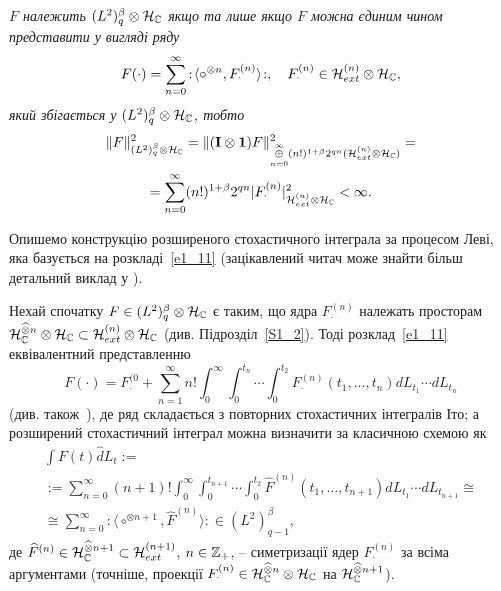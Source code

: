 {\it $F$ належить $(L^2)^\beta_q\otimes\mathcal{H}_{\mathbb{C}}$ якщо та лише якщо $F$ можна
єдиним чином представити у вигляді ряду
\begin{equation}\label{e1_11}
F(\cdot)=\sum_{n=0}^\infty{:\!\langle}\circ^{\otimes n},
F^{(n)}_\cdot{\rangle\!:},
\quad F^{(n)}_\cdot\in\mathcal{H}_{ext}^{(n)}\otimes\mathcal{H}_{\mathbb{C}},
\end{equation}
який збігається у $(L^2)^\beta_q\otimes\mathcal{H}_{\mathbb{C}}$, тобто
\begin{equation}\label{e1_12}
\begin{gathered}
\|F\|_{(L^2)^\beta_q\otimes\mathcal{H}_{\mathbb{C}}}^2
=\|(\mathbf I\otimes\mathbf 1)F\|_{\mathop{\oplus}\limits_{n=0}^\infty (n!)^{1+\beta}2^{qn}
(\mathcal{H}_{ext}^{(n)}\otimes\mathcal{H}_{\mathbb{C}})}^2=\\
=\sum_{n=0}^\infty (n!)^{1+\beta}2^{qn}
|F^{(n)}_\cdot|_{\mathcal{H}_{ext}^{(n)}\otimes\mathcal{H}_{\mathbb{C}}}^2<\infty.
\end{gathered}
\end{equation}
}

Опишемо конструкцію розширеного стохастичного інтеграла за процесом Леві, яка
базується на розкладі~\eqref{e1_11} (зацікавлений читач може знайти більш детальний виклад у
\cite{K13,K13_2}).

Нехай спочатку $F\in (L^2)^\beta_q\otimes\mathcal{H}_{\mathbb{C}}$ є таким,
що ядра $F^{(n)}_\cdot$ належать просторам
$\mathcal{H}_{\mathbb{C}}^{\widehat\otimes n}\otimes\mathcal{H}_{\mathbb{C}}
\subset\mathcal{H}_{ext}^{(n)}\otimes\mathcal{H}_{\mathbb{C}}$ (див. Підрозділ~\ref{S1_2}). Тоді
розклад~\eqref{e1_11} еквівалентний представленню
\begin{equation}\label{e1_13}
F(\cdot)=F^{(0}_\cdot+\sum_{n=1}^\infty n!\int_0^\infty\int_0^{t_n}\cdots\int_0^{t_2}
F^{(n)}_\cdot (t_1,\dots,t_n)dL_{t_1}\cdots dL_{t_n}
\end{equation}
\cite{K13} (див. також~\cite{K07}), де ряд складається з повторних стохастичних інтегралів Іто;
а розширений стохастичний інтеграл можна визначити за класичною схемою як
\begin{equation}\label{e1_14}
\begin{gathered}
\int F(t)\widehat dL_t:=\\
:=\sum_{n=0}^\infty (n+1)!\int_0^\infty\int_0^{t_{n+1}}\cdots\int_0^{t_2}
\widehat F^{(n)}(t_1,\dots,t_{n+1})dL_{t_1}\cdots dL_{t_{n+1}}\cong\\
\cong\sum_{n=0}^\infty{:\!\langle}\circ^{\otimes n+1},
\widehat F^{(n)}{\rangle\!:}
\in (L^2)^\beta_{q-1},
\end{gathered}
\end{equation}
де $\widehat F^{(n)}\in\mathcal{H}_{\mathbb{C}}^{\widehat\otimes n+1}
\subset\mathcal{H}_{ext}^{(n+1)}$, $n\in\mathbb{Z}_+$, -- симетризації ядер $F^{(n)}_\cdot$ за
всіма аргументами (точніше, проекції
$F^{(n)}_\cdot\in\mathcal{H}_{\mathbb{C}}^{\widehat\otimes n}\otimes\mathcal{H}_{\mathbb{C}}$
на $\mathcal{H}_{\mathbb{C}}^{\widehat\otimes n+1}$).

